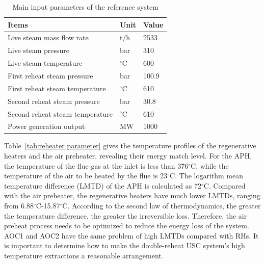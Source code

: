 \documentclass[preprint,12pt]{elsarticle}
\begin{document}
\begin{table}[htbp]
\caption{Main input parameters of the reference system }
\label{tab:ref input}
\centering
\begin{tabular}{lll}
\toprule 
Items & Unit & Value\tabularnewline
\midrule
 Live steam mass flow rate 	    	&t/h 			&2533 \\
 Live steam pressure 		    	&bar 			&310\\
 Live steam temperature		     	&$^\circ$C		&600		\\
 First reheat steam pressure    	&bar			&100.9		\\
 First reheat steam temperature  	&$^\circ$C		&610		\\
 Second reheat steam pressure    	&bar			&30.8		\\
 Second reheat steam temperature 	&$^\circ$C		&610		\\
 Power generation output 			&MW				&1000		\\
\bottomrule
\end{tabular}	
\end{table}

Table~\ref{tab:reheater parameter} gives the temperature profiles of the regenerative heaters and the air preheater, revealing their energy match level.
For the APH, the temperature of the flue gas at the inlet is less than 376$^\circ$C,  
 while the temperature of the air to be heated by the flue is 23$^\circ$C.
The logarithm mean temperature difference (LMTD) of the APH is calculated as 72$^\circ$C.
Compared with the air preheater, the regenerative heaters have much lower LMTDs, ranging from 6.88$^\circ$C-15.87$^\circ$C.
According to the second law of thermodynamics, the greater the temperature difference, the greater the irreversible loss.
Therefore, the air preheat process needs to be optimized to reduce the energy loss of the system.
AOC1 and AOC2 have the same problem of high LMTDs compared with RHs.
It is important to determine how to make the double-reheat USC system's high temperature extractions a reasonable arrangement. 
\end{document}
